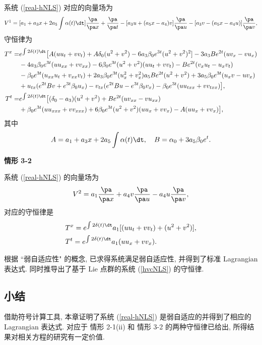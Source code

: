 系统 (\ref{real-hNLS}) 对应的向量场为
\begin{equation}
V^1=[a_1+a_3x+2a_5\int\alpha(t)\dt]\frac{\pa }{\pa x}+\frac{\pa}{\pa t}-[a_3u+(a_5x-a_4)v]\frac{\pa}{\pa u}-[a_3v-(a_5x-a_4u)]\frac{\pa}{\pa v},
\end{equation}
守恒律为
\begin{equation}
\begin{aligned}
T^x=&e^{\int 2\delta(t)\dt}\big[A(uu_t+vv_t)+A\delta_0(u^2+v^2)-6a_3\beta_0e^{3t}(u^2+v^2)^2] -3a_3Be^{2t}(uv_x-vu_x)\\
&-4a_3\beta_0e^{3t}(uu_{xx}+vv_{xx})-6\beta_0e^{3t}(u^2+v^2)(uu_t+vv_t) -Be^{2t}(v_xu_t-u_xv_t)\\
&-\beta_0e^{3t}(u_{xx}u_t+v_{xx}v_t)+2a_3\beta_0e^{3t}(u_x^2+v_x^2) a_5Be^{2t}(u^2+v^2)+3a_5\beta_0e^{3t}(u_xv-uv_x)\\
&+u_{tx}(e^{2t}Bv+e^{3t}\beta_0u_x) -v_{tx}(e^{2t}Bu-e^{3t}\beta_0v_x)-\beta_0e^{3t}(uu_{txx}+vv_{txx})\big],\\
T^t=&e^{\int 2\delta(t)\dt}\big[(\delta_0-a_3)(u^2+v^2)+Be^{2t}(uv_{xx}-vu_{xx})\\ &+\beta_0e^{3t}(uu_{xxx}+vv_{xxx})+6\beta_0e^{3t}(u^2+v^2)(uu_x+vv_x)-A(uu_x+vv_x)\big],
\end{aligned}
\end{equation}
其中
$$A=a_1+a_3x+2a_5\int\alpha(t)\dt,\quad B=\alpha_0+3a_5\beta_0e^t.$$

\noindent \textbf{情形 3-2}

系统 (\ref{real-hNLS}) 的向量场为
\begin{equation}
V^2=a_1\frac{\pa }{\pa x}+a_4v\frac{\pa}{\pa u}-a_4u\frac{\pa}{\pa v},
\end{equation}
对应的守恒律是
\begin{equation}
\begin{aligned}
&T^x=e^{\int 2\delta(t)\dt}a_1[(uu_t+vv_t)+(u^2+v^2)],\\
&T^t=e^{\int 2\delta(t)\dt}a_1(uu_x+vv_x).
\end{aligned}
\end{equation}




根据 ``弱自适应性" 的概念, 已求得系统满足弱自适应性, 并得到了标准 Lagrangian 表达式. 同时推导出了基于 Lie 点群的系统 (\ref{hvcNLS}) 的守恒律.
\subsection{小结}
借助符号计算工具, 本章证明了系统 (\ref{real-hNLS}) 是弱自适应的并得到了相应的 Lagrangian 表达式. 对应于 情形 2-1(ii) 和 情形 3-2 的两种守恒律已给出, 所得结果对相关方程的研究有一定价值.

